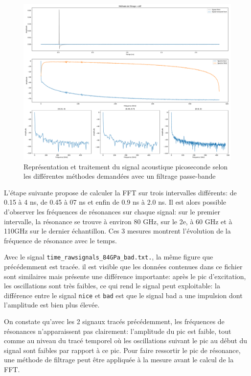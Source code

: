 \documentclass[a4paper, 11pt]{article}
\begin{document}
\begin{figure}[H]
	\centering
	\includegraphics[width=\linewidth]{Figures/TDS1_bad.pdf}
	\caption{Représentation et traitement du signal acoustique picoseconde selon les différentes méthodes demandées avec un filtrage passe-bande}
	\label{fig:tds1_bad} 
\end{figure}

L'étape suivante propose de calculer la FFT sur trois intervalles différents: de 0.15 à 4 ns, de 0.45 à 07 ns et enfin de 0.9 ns à 2.0 ns. Il est alors possible d'observer les fréquences de  résonances sur chaque signal: sur le premier intervalle, la résonance se trouve à environ 80 GHz, sur le 2e, à 60 GHz et à 110GHz sur le dernier échantillon. Ces 3 mesures montrent l'évolution de la fréquence de résonance avec le temps.

Avec le signal \verb|time_rawsignals_84GPa_bad.txt.|, la même figure que précédemment est tracée. il est visible que les données contenues dans ce fichier sont similaires mais présente une différence importante: après le pic d'excitation, les oscillations sont très faibles, ce qui rend le signal peut exploitable: la différence entre le signal \verb|nice| et \verb|bad| est que le signal bad a une impulsion dont l'amplitude est bien plus élevée.

On constate qu'avec les 2 signaux tracés précédemment, les fréquences de résonances n'apparaissent pas clairement: l'amplitude du pic est faible, tout comme au niveau du tracé temporel où les oscillations suivant le pic au début du signal sont faibles par rapport à ce pic. Pour faire ressortir le pic de résonance, une méthode de filtrage peut être appliquée à la mesure avant le calcul de la FFT. 
\end{document}
